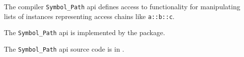 
The compiler {\tt Symbol\_Path} api defines access to functionality for 
manipulating lists of  instances representing access chains like 
{\tt a::b::c}.

The {\tt Symbol\_Path} api is implemented by the  package.

The {\tt Symbol\_Path} api source code is in .

